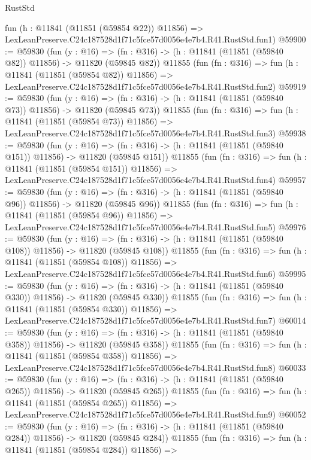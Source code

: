 \begin{lexlean}{RustStd}
\begin{coremodule}
    fun (h : @11841 (@11851 (@59854 @22)) @11856) =>
    LexLeanPreserve.C24c187528d1f71c5fce57d0056e4e7b4.R41.RustStd.fun1)
@59900 := @59830
    (fun (y : @16) =>
    (fn : @316) -> (h : @11841 (@11851 (@59840 @82)) @11856) -> @11820 (@59845 @82))
    @11855
    (fun (fn : @316) =>
    fun (h : @11841 (@11851 (@59854 @82)) @11856) =>
    LexLeanPreserve.C24c187528d1f71c5fce57d0056e4e7b4.R41.RustStd.fun2)
@59919 := @59830
    (fun (y : @16) =>
    (fn : @316) -> (h : @11841 (@11851 (@59840 @73)) @11856) -> @11820 (@59845 @73))
    @11855
    (fun (fn : @316) =>
    fun (h : @11841 (@11851 (@59854 @73)) @11856) =>
    LexLeanPreserve.C24c187528d1f71c5fce57d0056e4e7b4.R41.RustStd.fun3)
@59938 := @59830
    (fun (y : @16) =>
    (fn : @316) -> (h : @11841 (@11851 (@59840 @151)) @11856) -> @11820 (@59845 @151))
    @11855
    (fun (fn : @316) =>
    fun (h : @11841 (@11851 (@59854 @151)) @11856) =>
    LexLeanPreserve.C24c187528d1f71c5fce57d0056e4e7b4.R41.RustStd.fun4)
@59957 := @59830
    (fun (y : @16) =>
    (fn : @316) -> (h : @11841 (@11851 (@59840 @96)) @11856) -> @11820 (@59845 @96))
    @11855
    (fun (fn : @316) =>
    fun (h : @11841 (@11851 (@59854 @96)) @11856) =>
    LexLeanPreserve.C24c187528d1f71c5fce57d0056e4e7b4.R41.RustStd.fun5)
@59976 := @59830
    (fun (y : @16) =>
    (fn : @316) -> (h : @11841 (@11851 (@59840 @108)) @11856) -> @11820 (@59845 @108))
    @11855
    (fun (fn : @316) =>
    fun (h : @11841 (@11851 (@59854 @108)) @11856) =>
    LexLeanPreserve.C24c187528d1f71c5fce57d0056e4e7b4.R41.RustStd.fun6)
@59995 := @59830
    (fun (y : @16) =>
    (fn : @316) -> (h : @11841 (@11851 (@59840 @330)) @11856) -> @11820 (@59845 @330))
    @11855
    (fun (fn : @316) =>
    fun (h : @11841 (@11851 (@59854 @330)) @11856) =>
    LexLeanPreserve.C24c187528d1f71c5fce57d0056e4e7b4.R41.RustStd.fun7)
@60014 := @59830
    (fun (y : @16) =>
    (fn : @316) -> (h : @11841 (@11851 (@59840 @358)) @11856) -> @11820 (@59845 @358))
    @11855
    (fun (fn : @316) =>
    fun (h : @11841 (@11851 (@59854 @358)) @11856) =>
    LexLeanPreserve.C24c187528d1f71c5fce57d0056e4e7b4.R41.RustStd.fun8)
@60033 := @59830
    (fun (y : @16) =>
    (fn : @316) -> (h : @11841 (@11851 (@59840 @265)) @11856) -> @11820 (@59845 @265))
    @11855
    (fun (fn : @316) =>
    fun (h : @11841 (@11851 (@59854 @265)) @11856) =>
    LexLeanPreserve.C24c187528d1f71c5fce57d0056e4e7b4.R41.RustStd.fun9)
@60052 := @59830
    (fun (y : @16) =>
    (fn : @316) -> (h : @11841 (@11851 (@59840 @284)) @11856) -> @11820 (@59845 @284))
    @11855
    (fun (fn : @316) =>
    fun (h : @11841 (@11851 (@59854 @284)) @11856) =>

\end{coremodule}
\end{lexlean}
